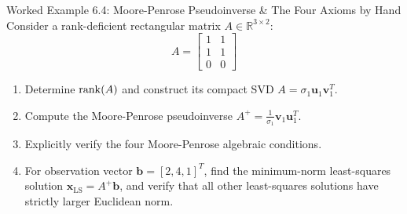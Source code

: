 \begin{examplebox}[breakable]{Worked Example 6.4: Moore-Penrose Pseudoinverse \& The Four Axioms by Hand}
Consider a rank-deficient rectangular matrix $A \in \mathbb{R}^{3 \times 2}$:
\begin{equation}
A = \begin{bmatrix} 1 & 1 \\ 1 & 1 \\ 0 & 0 \end{bmatrix}
\end{equation}
\begin{enumerate}
    \item Determine $\operatorname{rank}(A)$ and construct its compact SVD $A = \sigma_1 \mathbf{u}_1 \mathbf{v}_1^T$.
    \item Compute the Moore-Penrose pseudoinverse $A^+ = \frac{1}{\sigma_1} \mathbf{v}_1 \mathbf{u}_1^T$.
    \item Explicitly verify the four Moore-Penrose algebraic conditions.
    \item For observation vector $\mathbf{b} = [2, 4, 1]^T$, find the minimum-norm least-squares solution $\mathbf{x}_{\text{LS}} = A^+ \mathbf{b}$, and verify that all other least-squares solutions have strictly larger Euclidean norm.
\end{enumerate}


\end{examplebox}
